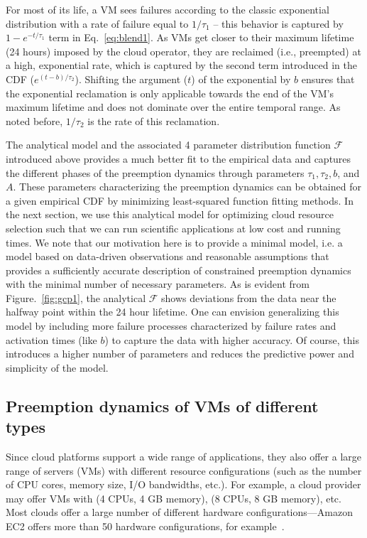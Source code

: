 For most of its life, a VM sees failures according to the classic exponential distribution with a rate of failure equal to $1/\tau_1$ -- this behavior is captured by $1-e^{-t/\tau_1}$ term in Eq.~\ref{eq:blend1}. 
As VMs get closer to their maximum lifetime (24 hours) imposed by the cloud operator, they are reclaimed (i.e., preempted) at a high, exponential rate, which is captured by the second term introduced in the CDF ($e^{(t-b)/\tau_2}$). 
Shifting the argument ($t$) of the exponential by $b$ ensures that the exponential reclamation is only applicable towards the end of the VM's maximum lifetime and does not dominate over the entire temporal range. As noted before, $1/\tau_2$ is the rate of this reclamation.

The analytical model and the associated 4 parameter distribution function $\mathscr{F}$ introduced above provides a much better fit to the empirical data and captures the different phases of the preemption dynamics through parameters $\tau_1, \tau_2, b$, and $A$. These parameters characterizing the preemption dynamics can be obtained for a given empirical CDF by minimizing least-squared function fitting methods. \footnotemark 
%
%
In the next section, we use this analytical model for optimizing cloud resource selection such that we can run scientific applications at low cost and running times. We note that our motivation here is to provide a minimal model, i.e. a model based on data-driven observations and reasonable assumptions that provides a sufficiently accurate description of constrained preemption dynamics with the minimal number of necessary parameters. As is evident from Figure.~\ref{fig:gcp1}, the analytical $\mathscr{F}$ shows deviations from the data near the halfway point within the 24 hour lifetime. One can envision generalizing this model by including more failure processes characterized by failure rates and activation times (like $b$) to capture the data with higher accuracy. Of course, this introduces a higher number of parameters and reduces the predictive power and simplicity of the model. 


\subsection{Preemption dynamics of VMs of different types}
\label{subsec:types-dynamics}
Since cloud platforms support a wide range of applications, they also offer a large range of servers (VMs) with different resource configurations (such as the number of CPU cores, memory size, I/O bandwidths, etc.). 
For example, a cloud provider may offer VMs with (4 CPUs, 4 GB memory), (8 CPUs, 8 GB memory), etc.
Most clouds offer a large number of different hardware configurations---Amazon EC2 offers more than 50 hardware configurations, for example~\cite{amazon-ec2-instance-types}.

